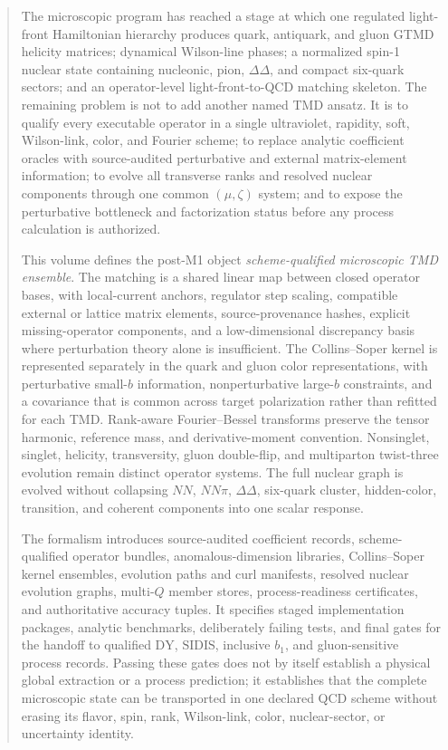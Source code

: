 \documentclass[11pt]{article}
\newcommand{\DY}{\mathrm{DY}}
\newcommand{\SIDIS}{\mathrm{SIDIS}}
\begin{document}
\begin{abstract}
The microscopic program has reached a stage at which one regulated light-front Hamiltonian hierarchy produces quark, antiquark, and gluon GTMD helicity matrices; dynamical Wilson-line phases; a normalized spin-1 nuclear state containing nucleonic, pion, \(\Delta\Delta\), and compact six-quark sectors; and an operator-level light-front-to-QCD matching skeleton.  The remaining problem is not to add another named TMD ansatz.  It is to qualify every executable operator in a single ultraviolet, rapidity, soft, Wilson-link, color, and Fourier scheme; to replace analytic coefficient oracles with source-audited perturbative and external matrix-element information; to evolve all transverse ranks and resolved nuclear components through one common \((\mu,\zeta)\) system; and to expose the perturbative bottleneck and factorization status before any process calculation is authorized.

This volume defines the post-M1 object \emph{scheme-qualified microscopic TMD ensemble}.  The matching is a shared linear map between closed operator bases, with local-current anchors, regulator step scaling, compatible external or lattice matrix elements, source-provenance hashes, explicit missing-operator components, and a low-dimensional discrepancy basis where perturbation theory alone is insufficient.  The Collins--Soper kernel is represented separately in the quark and gluon color representations, with perturbative small-\(b\) information, nonperturbative large-\(b\) constraints, and a covariance that is common across target polarization rather than refitted for each TMD.  Rank-aware Fourier--Bessel transforms preserve the tensor harmonic, reference mass, and derivative-moment convention.  Nonsinglet, singlet, helicity, transversity, gluon double-flip, and multiparton twist-three evolution remain distinct operator systems.  The full nuclear graph is evolved without collapsing \(NN\), \(NN\pi\), \(\Delta\Delta\), six-quark cluster, hidden-color, transition, and coherent components into one scalar response.

The formalism introduces source-audited coefficient records, scheme-qualified operator bundles, anomalous-dimension libraries, Collins--Soper kernel ensembles, evolution paths and curl manifests, resolved nuclear evolution graphs, multi-\(Q\) member stores, process-readiness certificates, and authoritative accuracy tuples.  It specifies staged implementation packages, analytic benchmarks, deliberately failing tests, and final gates for the handoff to qualified \(\DY\), \(\SIDIS\), inclusive \(b_1\), and gluon-sensitive process records.  Passing these gates does not by itself establish a physical global extraction or a process prediction; it establishes that the complete microscopic state can be transported in one declared QCD scheme without erasing its flavor, spin, rank, Wilson-link, color, nuclear-sector, or uncertainty identity.
\end{abstract}
\end{document}
